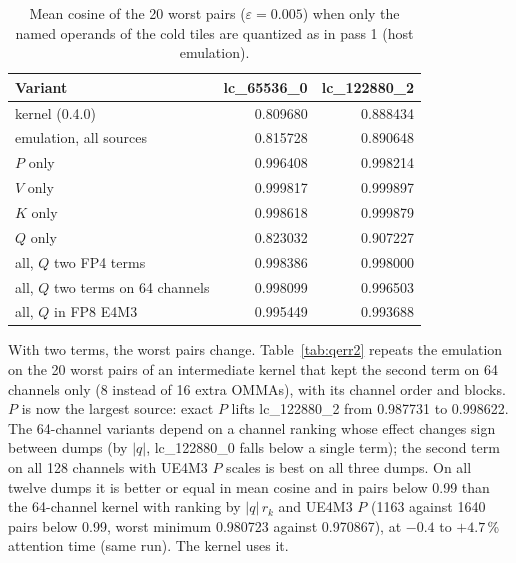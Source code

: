\documentclass[10pt,twocolumn]{article}
\newcommand{\eps}{\varepsilon}
\begin{document}
\begin{table}[t]
\centering\small
\setlength{\tabcolsep}{3pt}
\begin{tabular}{@{}lrr@{}}
\toprule
Variant & lc\_65536\_0 & lc\_122880\_2 \\
\midrule
kernel (0.4.0) & 0.809680 & 0.888434 \\
emulation, all sources & 0.815728 & 0.890648 \\
$P$ only & 0.996408 & 0.998214 \\
$V$ only & 0.999817 & 0.999897 \\
$K$ only & 0.998618 & 0.999879 \\
$Q$ only & 0.823032 & 0.907227 \\
all, $Q$ two FP4 terms & 0.998386 & 0.998000 \\
all, $Q$ two terms on 64 channels & 0.998099 & 0.996503 \\
all, $Q$ in FP8 E4M3 & 0.995449 & 0.993688 \\
\bottomrule
\end{tabular}
\caption{Mean cosine of the 20 worst pairs ($\eps=0.005$) when only the named operands of the cold tiles are
quantized as in pass 1 (host emulation).}
\label{tab:qerr}
\end{table}


With two terms, the worst pairs change. Table~\ref{tab:qerr2} repeats the emulation on the 20 worst pairs of an
intermediate kernel that kept the second term on 64 channels only (8 instead of 16 extra OMMAs), with its channel
order and blocks. $P$ is now the largest source: exact $P$ lifts lc\_122880\_2 from 0.987731 to 0.998622. The
64-channel variants depend on a channel ranking whose effect changes sign between dumps (by $|q|$, lc\_122880\_0
falls below a single term); the second term on all 128 channels with UE4M3 $P$ scales is best on all three dumps.
On all twelve dumps it is better or equal in mean cosine and in pairs below 0.99 than the 64-channel kernel with
ranking by $|q|\,r_k$ and UE4M3 $P$ (1163 against 1640 pairs below 0.99, worst minimum 0.980723 against 0.970867),
at $-0.4$ to $+4.7$\,\% attention time (same run). The kernel uses it.
\end{document}

